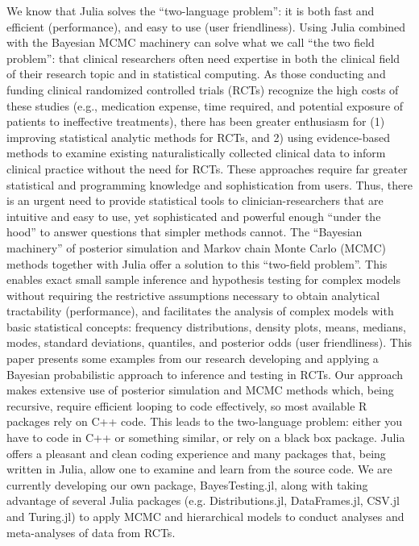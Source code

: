 \documentclass{juliacon}
\begin{document}
We know that Julia solves the “two-language problem”: it is both fast and efficient (performance), and easy to use (user friendliness).\cite{bezanson2017julia}  Using Julia combined with the Bayesian MCMC machinery can solve what we call “the two field problem”: that clinical researchers often need expertise in both the clinical field of their research topic and in statistical computing.  
\vskip 6pt
As those conducting and funding clinical randomized controlled trials (RCTs) recognize the high costs of these studies (e.g., medication expense, time required, and potential exposure of patients to ineffective treatments), there has been greater enthusiasm for (1) improving statistical analytic methods for RCTs, and 2) using evidence-based methods to examine existing naturalistically collected clinical data to inform clinical practice without the need for RCTs.  These approaches require far greater statistical and programming knowledge and sophistication from users.  Thus, there is an urgent need to provide statistical tools to clinician-researchers that are intuitive and easy to use, yet sophisticated and powerful enough “under the hood” to answer questions that simpler methods cannot.
\vskip 6pt
The “Bayesian machinery” of posterior simulation and Markov chain Monte Carlo (MCMC) methods together with Julia offer a solution to this “two-field problem”. This enables exact small sample inference and hypothesis testing for complex models without requiring the restrictive assumptions necessary to obtain analytical tractability (performance), and facilitates the analysis of complex models with basic statistical concepts: frequency distributions, density plots, means, medians, modes, standard deviations, quantiles, and posterior odds (user friendliness).\cite{Mills2019} 
\vskip 6pt
This paper presents some examples from our research developing and applying a Bayesian probabilistic approach to inference and testing in RCTs.\cite{Mills2019, Strawn2019, Strawn2018, Strawn2017, Strawn2018a} Our approach makes extensive use of posterior simulation and MCMC methods which, being recursive, require efficient looping to code effectively, so most available R packages rely on C++ code.  This leads to the two-language problem: either you have to code in C++ or something similar, or rely on a black box package.  Julia offers a pleasant and clean coding experience and many packages that, being written in Julia, allow one to examine and learn from the source code.  We are currently developing our own package, BayesTesting.jl,\cite{Mills2018} along with taking advantage of several Julia packages (e.g. Distributions.jl, DataFrames.jl, CSV.jl and Turing.jl) to apply MCMC and hierarchical models to conduct analyses and meta-analyses of data from RCTs.\cite{Strawn2019}
\end{document}
